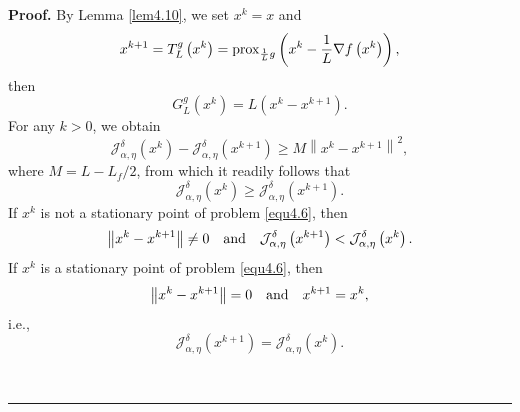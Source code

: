 \documentclass[a4paper,12pt]{article}
\numberwithin{equation}{section}
\newenvironment{proof}[1][Proof]{\textbf{#1.} }
{\ \rule{0.75em}{0.75em}\smallskip}
\begin{document}
\begin{proof}
    By Lemma \ref{lem4.10}, we set $x^{k}=x$ and 
    \begin{equation*}
        x^{k+1}=T_{L}^{g}\left(x^{k}\right)={\rm prox}_{\frac{1}{L}g}\left(x^{k}-\frac{1}{L}\nabla f\left(x^{k}\right)\right),
    \end{equation*}
    then 
    \begin{equation*}
        G_{L}^{g}\left(x^{k}\right)=L\left(x^{k}-x^{k+1}\right).
    \end{equation*}
    For any $k>0$, we obtain
    \begin{equation*}
        \mathcal{J}_{\alpha,\eta}^{\delta}\left(x^{k}\right)- \mathcal{J}_{\alpha,\eta}^{\delta}\left(x^{k+1}\right)\geq M\left\|x^{k}-x^{k+1}\right\|^{2},
    \end{equation*}
     where $M=L-L_{f}/2$, from which it readily follows that 
    \begin{equation*}
        \mathcal{J}_{\alpha,\eta}^{\delta}\left(x^{k}\right)\geq \mathcal{J}_{\alpha,\eta}^{\delta}\left(x^{k+1}\right).
    \end{equation*}
    If $x^{k}$ is not a stationary point of problem \eqref{equ4.6}, then
    \begin{equation*}
        \left\|x^{k}-x^{k+1}\right\|\neq 0\quad {\rm and}\quad \mathcal{J}_{\alpha,\eta}^{\delta}\left(x^{k+1}\right)< \mathcal{J}_{\alpha,\eta}^{\delta}\left(x^{k}\right).
    \end{equation*} 
    If $x^{k}$ is a stationary point of problem \eqref{equ4.6}, then 
    \begin{equation*}
        \left\|x^{k}-x^{k+1}\right\|= 0\quad {\rm and}\quad x^{k+1}=x^{k},
    \end{equation*} 
    i.e., 
    \begin{equation*}
        \mathcal{J}_{\alpha,\eta}^{\delta}\left(x^{k+1}\right)= \mathcal{J}_{\alpha,\eta}^{\delta}\left(x^{k}\right).
    \end{equation*}
    

\end{proof}
\end{document}
